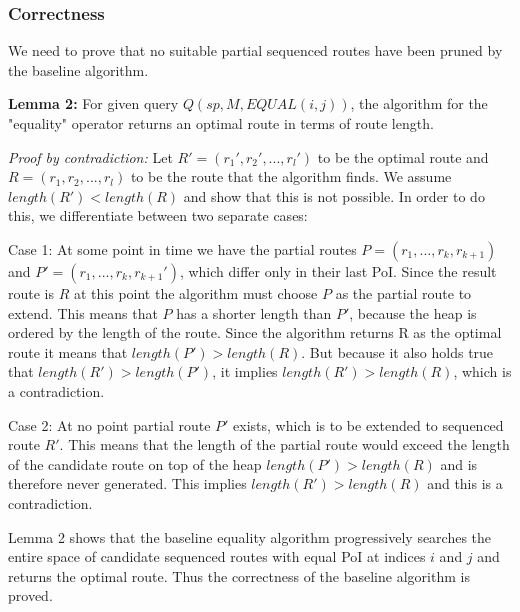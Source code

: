 \subsubsection{Correctness}
We need to prove that no suitable partial sequenced routes have been pruned by the baseline algorithm.

\textbf{Lemma 2:} For given query $Q(sp, M, EQUAL(i, j))$, the algorithm for the "equality" operator returns an optimal route in terms of route length.

\textit{Proof by contradiction:} Let $R' = (r_1', r_2', ..., r_l')$ to be the optimal route and $R = (r_1, r_2, ..., r_l)$ to be the route that the algorithm finds. We assume $length(R') < length(R)$ and show that this is not possible. In order to do this, we differentiate between two separate cases: 

Case 1: At some point in time we have the partial routes $P = (r_1, ..., r_k, r_{k+1})$ and $P' = (r_1, ..., r_k, r_{k+1}')$, which differ only in their last PoI. Since the result route is $R$ at this point the algorithm must choose $P$ as the partial route to extend. This means that $P$ has a shorter length than $P'$, because the heap is ordered by the length of the route. Since the algorithm returns R as the optimal route it means that $length(P') > length(R)$. But because it also holds true that $length(R') > length(P')$, it implies $length(R') > length(R)$, which is a contradiction.

Case 2: At no point partial route $P'$ exists, which is to be extended to sequenced route $R'$. This means that the length of the partial route would exceed the length of the candidate route on top of the heap $length(P') > length(R)$ and is therefore never generated. This implies $length(R') > length(R)$ and this is a contradiction.

Lemma 2 shows that the baseline equality algorithm progressively searches the entire space of candidate sequenced routes with equal PoI at indices $i$ and $j$ and returns the optimal route. Thus the correctness of the baseline algorithm is proved.